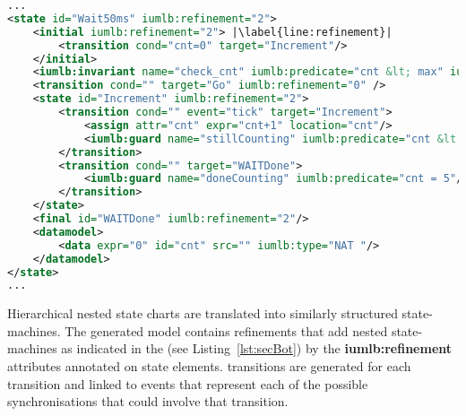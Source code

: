 \begin{lstlisting}[caption={\textbf{Wait50ms} state snippet of \SCXML model representation illustrating the use of different \SCXML modeling features, as well as, added syntax extensions},label={lst:secBot}, language=xml, escapechar=|, frame=single, float=t]
...
<state id="Wait50ms" iumlb:refinement="2">
	<initial iumlb:refinement="2"> |\label{line:refinement}|
		<transition cond="cnt=0" target="Increment"/> 
	</initial>
	<iumlb:invariant name="check_cnt" iumlb:predicate="cnt &lt; max" iumlb:refinement="2"/> |\label{line:invariant}|
	<transition cond="" target="Go" iumlb:refinement="0" />
	<state id="Increment" iumlb:refinement="2">
		<transition cond="" event="tick" target="Increment">
			<assign attr="cnt" expr="cnt+1" location="cnt"/>
			<iumlb:guard name="stillCounting" iumlb:predicate="cnt &lt; 5"/> |\label{line:predicate}|
		</transition>
		<transition cond="" target="WAITDone">
			<iumlb:guard name="doneCounting" iumlb:predicate="cnt = 5"/> |\label{line:guard}|
    	</transition>
	</state>
	<final id="WAITDone" iumlb:refinement="2"/>
	<datamodel>
		<data expr="0" id="cnt" src="" iumlb:type="NAT "/>
	</datamodel>
</state>
...
\end{lstlisting}

Hierarchical nested state charts are translated into similarly structured \iUMLB state-machines. The generated \iUMLB model contains refinements that add nested state-machines as indicated in the  \SCXML \statechart (see Listing~\ref{lst:secBot}) by the \textbf{iumlb:refinement} attributes annotated on state elements. \iUMLB transitions are generated for each \SCXML transition and linked to \EventB events that represent each of the possible synchronisations that could involve that transition.


